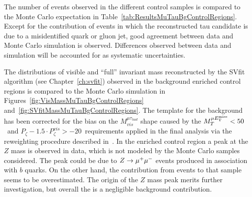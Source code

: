 The number of events observed in the different control samples is compared to
the Monte Carlo expectation in Table~\ref{tab:ResultsMuTauBgControlRegions}.
Except for the contribution of \ZMM events in which the
reconstructed tau candidate is due to a misidentified quark or gluon jet,
good agreement between data and Monte Carlo simulation is observed.  Differences
observed between data and simulation will be accounted for as systematic
uncertainties.

The distributions of visible and ``full'' \TT invariant mass reconstructed by
the SVfit algorithm (see Chapter~\ref{ch:svfit}) observed in the background
enriched control regions is compared to the Monte Carlo simulation in
Figures~\ref{fig:VisMassMuTauBgControlRegions}
and~\ref{fig:SVfitMassMuTauBgControlRegions}.  The template for the \WpJets
background has been corrected for the bias on the $M_{vis}^{\mu \tau_{had}}$
shape caused by the $M_{T}^{\mu E_{\mathrm{T}}^{\text{miss}}} < 50$~\GeVcc and $P_{\zeta} - 1.5 \cdot
P_{\zeta}^{vis} > -20$~\GeV requirements applied in the final analysis
via the reweighting procedure described in~\cite{CMS_AN_2010-088}.  In the
\ttbarpJets enriched control region a peak at the $Z$ mass is observed in data,
which is not modeled by the Monte Carlo samples considered.  The peak could be
due to $\mbox{\ensuremath{Z\to\mu^+\mu^-}}$ events produced in association with $b$ quarks.  On the other
hand, the contribution from \ttbarpJets events to that sample seems to be
overestimated.  The origin of the $Z$ mass peak merits further investigation,
but overall the \ttbarpJets is a negligible background contribution.
%
